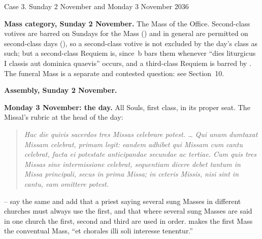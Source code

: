 \begin{casebox}{Case 3. Sunday 2 November and Monday 3 November 2036}
\begin{steps}
\item \textbf{Mass category, Sunday 2 November.} The Mass of the Office.
Second-class votives are barred on Sundays for the  Mass
() and in general are permitted on second-class days (), so
a second-class votive is not excluded by the day's class as such; but a
second-class Requiem is, since \,b bars them whenever ``dies
liturgicus I classis aut dominica quaevis'' occurs, and a third-class Requiem
is barred by . The funeral Mass is a separate and contested question:
see Section~10.

\item \textbf{Assembly, Sunday 2 November.}

\item \textbf{Monday 3 November: the day.} All Souls, first class, in its
proper seat. The Missal's rubric at the head of the day:

\begin{quote}\itshape\small
Hac die quivis sacerdos tres Missas celebrare potest. \dots{} Qui unam
dumtaxat Missam celebrat, primam legit: eandem adhibet qui Missam cum cantu
celebrat, facta ei potestate anticipandae secundae ac tertiae. Cum quis tres
Missas sine intermissione celebrat, sequentiam dicere debet tantum in Missa
principali, secus in prima Missa; in ceteris Missis, nisi sint in cantu, eam
omittere potest.
\end{quote}

-- say the same and add that a priest saying several sung
Masses in different churches must always use the first, and that where several
sung Masses are said in one church the first, second and third are used in
order.  makes the first Mass the conventual Mass, ``et chorales illi
soli interesse tenentur.''


\end{steps}
\end{casebox}
